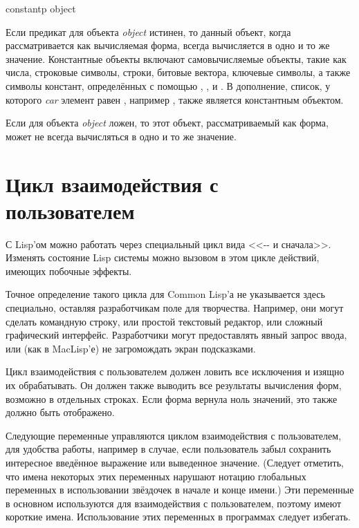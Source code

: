 \begin{defun}[Function]
constantp object

Если предикат  для объекта \emph{object} истинен, то данный
объект, когда рассматривается как вычисляемая форма, всегда вычисляется в одно и
то же значение.
Константные объекты включают самовычисляемые объекты, такие как числа, строковые
символы, строки, битовые вектора, ключевые символы, а также символы констант,
определённых с помощью , ,  и .
В дополнение, список, у которого \emph{car} элемент равен , например
, также является константным объектом.

Если  для объекта \emph{object} ложен, то этот объект,
рассматриваемый как форма, может не всегда вычисляться в одно и то же
значение.
\end{defun}

\section{Цикл взаимодействия с пользователем}

С Lisp'ом можно работать через специальный цикл вида
<<-- и сначала>>.
Изменять состояние Lisp системы можно вызовом в этом цикле действий, имеющих
побочные эффекты.  

Точное определение такого цикла для Common Lisp'а не указывается здесь
специально, оставляя разработчикам поле для творчества.
Например, они могут сделать командную строку, или простой текстовый редактор,
или сложный графический интерфейс. Разработчики могут предоставлять явный запрос
ввода, или (как в MacLisp'е) не загромождать экран подсказками.

Цикл взаимодействия с пользователем должен ловить все исключения и изящно их
обрабатывать. Он должен также выводить все результаты вычисления форм, возможно
в отдельных строках. Если форма вернула ноль значений, это также должно быть
отображено.

Следующие переменные управляются циклом взаимодействия с пользователем, для
удобства работы, например в случае, если пользователь забыл сохранить
интересное введённое выражение или выведенное значение. (Следует отметить, что
имена некоторых этих переменных нарушают нотацию глобальных переменных в
использовании звёздочек в начале и конце имени.) Эти переменные в основном
используются для взаимодействия с пользователем, поэтому имеют короткие
имена. Использование этих переменных в программах следует избегать.

